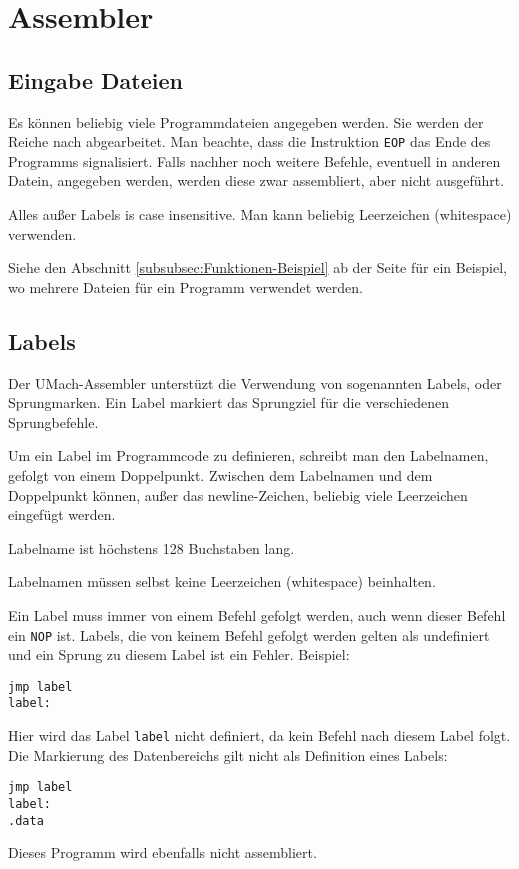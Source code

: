 \section{Assembler}

\subsection{Eingabe Dateien}

Es können beliebig viele Programmdateien angegeben werden. Sie werden der
Reiche nach abgearbeitet. Man beachte, dass die Instruktion \texttt{EOP} das
Ende des Programms signalisiert. Falls nachher noch weitere Befehle, eventuell
in anderen Datein, angegeben werden, werden diese zwar assembliert, aber nicht
ausgeführt.

Alles außer Labels is case insensitive. Man kann beliebig Leerzeichen
(whitespace) verwenden.


Siehe den Abschnitt \ref{subsubsec:Funktionen-Beispiel} ab der Seite
\pageref{subsubsec:Funktionen-Beispiel} für ein Beispiel, wo mehrere Dateien
für ein Programm verwendet werden.

\subsection{Labels}

Der UMach-Assembler unterstüzt die Verwendung von sogenannten \glqq Labels\grqq,
oder Sprungmarken. Ein Label markiert das Sprungziel für die verschiedenen
Sprungbefehle.

Um ein Label im Programmcode zu definieren, schreibt man den
Labelnamen, gefolgt von einem Doppelpunkt. Zwischen dem Labelnamen und dem
Doppelpunkt können, außer das \glqq newline\grqq-Zeichen, beliebig viele
Leerzeichen eingefügt werden.

Labelname ist höchstens 128 Buchstaben lang.

Labelnamen müssen selbst keine Leerzeichen (whitespace) beinhalten.

Ein Label muss immer von einem Befehl gefolgt werden, auch wenn dieser Befehl
ein \texttt{NOP} ist. Labels, die von keinem Befehl gefolgt werden gelten als
undefiniert und ein Sprung zu diesem Label ist ein Fehler. Beispiel:
\begin{lstlisting}
jmp label
label:
\end{lstlisting}
Hier wird das Label \texttt{label} nicht definiert, da kein Befehl nach diesem
Label folgt. Die Markierung des Datenbereichs gilt nicht als Definition eines
Labels:
\begin{lstlisting}
jmp label
label:
.data
\end{lstlisting}
Dieses Programm wird ebenfalls nicht assembliert.


